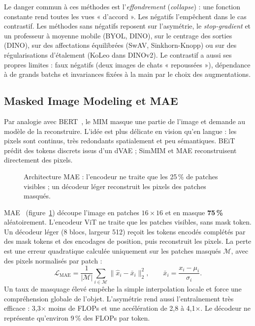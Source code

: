 \documentclass[11pt,a4paper]{article}
\begin{document}
Le danger commun à ces méthodes est l'\emph{effondrement} (\emph{collapse}) : une fonction constante rend toutes les vues « d'accord ». Les négatifs l'empêchent dans le cas contrastif. Les méthodes sans négatifs reposent sur l'asymétrie, le \emph{stop-gradient} et un professeur à moyenne mobile (BYOL, DINO), sur le centrage des sorties (DINO), sur des affectations équilibrées (SwAV, Sinkhorn-Knopp) ou sur des régularisations d'étalement (KoLeo dans DINOv2). Le contrastif a aussi ses propres limites : faux négatifs (deux images de chats « repoussées »), dépendance à de grands batchs et invariances fixées à la main par le choix des augmentations.

\subsection{Masked Image Modeling et MAE}
Par analogie avec BERT~\citep{devlin2019bert}, le MIM masque une partie de l'image et demande au modèle de la reconstruire. L'idée est plus délicate en vision qu'en langue : les pixels sont continus, très redondants spatialement et peu sémantiques. BEiT prédit des tokens discrets issus d'un dVAE ; SimMIM et MAE reconstruisent directement des pixels.

\begin{figure}[ht]
  \centering
  \resizebox{0.9\textwidth}{!}{}
  \caption{Architecture MAE : l'encodeur ne traite que les 25\,\% de patches visibles ; un décodeur léger reconstruit les pixels des patches masqués.}
  \label{fig:mae}
\end{figure}

MAE~\citep{he2022mae} (figure~\ref{fig:mae}) découpe l'image en patches $16\times16$ et en masque \textbf{75\,\%} aléatoirement. L'encodeur ViT ne traite que les patches visibles, sans mask token. Un décodeur léger (8 blocs, largeur 512) reçoit les tokens encodés complétés par des mask tokens et des encodages de position, puis reconstruit les pixels. La perte est une erreur quadratique calculée uniquement sur les patches masqués $\mathcal{M}$, avec des pixels normalisés par patch :
\begin{equation}
  \mathcal{L}_{\text{MAE}} = \frac{1}{|\mathcal{M}|}\sum_{i\in\mathcal{M}}\big\|\hat{x}_i-\bar{x}_i\big\|_2^2,\qquad \bar{x}_i=\frac{x_i-\mu_i}{\sigma_i}.
\end{equation}
Un taux de masquage élevé empêche la simple interpolation locale et force une compréhension globale de l'objet. L'asymétrie rend aussi l'entraînement très efficace : 3,3$\times$ moins de FLOPs et une accélération de 2,8 à 4,1$\times$. Le décodeur ne représente qu'environ 9\,\% des FLOPs par token.
\end{document}
